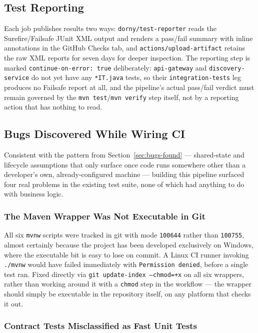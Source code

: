 \subsection{Test Reporting}

Each job publishes results two ways: \texttt{dorny/test-reporter} reads the Surefire/Failsafe JUnit XML output and renders a pass/fail summary with inline annotations in the GitHub Checks tab, and \texttt{actions/upload-artifact} retains the raw XML reports for seven days for deeper inspection. The reporting step is marked \texttt{continue-on-error: true} deliberately: \texttt{api-gateway} and \texttt{discovery-service} do not yet have any \texttt{*IT.java} tests, so their \texttt{integration-tests} leg produces no Failsafe report at all, and the pipeline's actual pass/fail verdict must remain governed by the \texttt{mvn test}/\texttt{mvn verify} step itself, not by a reporting action that has nothing to read.

\subsection{Bugs Discovered While Wiring CI}

Consistent with the pattern from Section~\ref{sec:bugs-found} --- shared-state and lifecycle assumptions that only surface once code runs somewhere other than a developer's own, already-configured machine --- building this pipeline surfaced four real problems in the existing test suite, none of which had anything to do with business logic.

\subsubsection{The Maven Wrapper Was Not Executable in Git}

All six \texttt{mvnw} scripts were tracked in git with mode \texttt{100644} rather than \texttt{100755}, almost certainly because the project has been developed exclusively on Windows, where the executable bit is easy to lose on commit. A Linux CI runner invoking \texttt{./mvnw} would have failed immediately with \texttt{Permission denied}, before a single test ran. Fixed directly via \texttt{git update-index --chmod=+x} on all six wrappers, rather than working around it with a \texttt{chmod} step in the workflow --- the wrapper should simply be executable in the repository itself, on any platform that checks it out.

\subsubsection{Contract Tests Misclassified as Fast Unit Tests}

